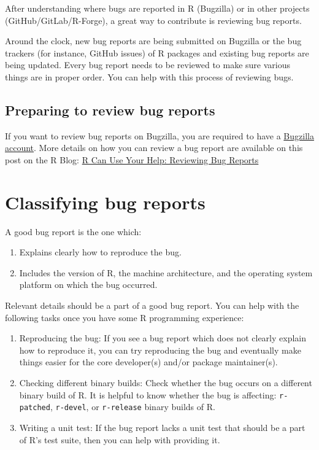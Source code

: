 \documentclass[
]{book}
\begin{document}
After understanding where bugs are reported in R (Bugzilla) or in other projects (GitHub/GitLab/R-Forge), a great way to contribute is reviewing bug reports.

Around the clock, new bug reports are being submitted on Bugzilla or the bug trackers (for instance, GitHub issues) of R packages and existing bug reports are being updated. Every bug report needs to be reviewed to make sure various things are in proper order. You can help with this process of reviewing bugs.

\hypertarget{preparing-to-review-bug-reports}{%
\subsection{Preparing to review bug reports}\label{preparing-to-review-bug-reports}}

If you want to review bug reports on Bugzilla, you are required to have a \protect\hyperlink{bugzilla-account}{Bugzilla account}. More details on how you can review a bug report are available on this post on the R Blog: \href{https://blog.r-project.org/2019/10/09/r-can-use-your-help-reviewing-bug-reports/index.html}{R Can Use Your Help: Reviewing Bug Reports}

\hypertarget{classifying-bug-reports}{%
\section{Classifying bug reports}\label{classifying-bug-reports}}

A good bug report is the one which:

\begin{enumerate}
\def\labelenumi{\arabic{enumi}.}
\item
  Explains clearly how to reproduce the bug.
\item
  Includes the version of R, the machine architecture, and the operating system platform on which the bug occurred.
\end{enumerate}

Relevant details should be a part of a good bug report. You can help with the following tasks once you have some R programming experience:

\begin{enumerate}
\def\labelenumi{\arabic{enumi}.}
\item
  Reproducing the bug: If you see a bug report which does not clearly explain how to reproduce it, you can try reproducing the bug and eventually make things easier for the core developer(s) and/or package maintainer(s).
\item
  Checking different binary builds: Check whether the bug occurs on a different binary build of R. It is helpful to know whether the bug is affecting: \texttt{r-patched}, \texttt{r-devel}, or \texttt{r-release} binary builds of R.
\item
  Writing a unit test: If the bug report lacks a unit test that should be a part of R's test suite, then you can help with providing it.
\end{enumerate}
\end{document}

